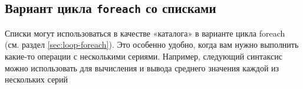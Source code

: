 \subsection{Вариант цикла \texttt{foreach} со списками}

Списки могут использоваться в качестве «каталога» в варианте цикла
foreach (см. раздел \ref{sec:loop-foreach}). Это особенно удобно,
когда вам нужно выполнить какие-то операции с несколькими
сериями. Например, следующий синтаксис можно использовать для
вычисления и вывода среднего значения каждой из нескольких серий


